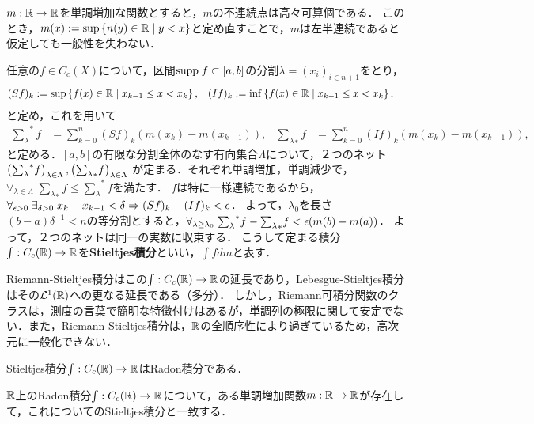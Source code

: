 \documentclass[uplatex,dvipdfmx]{jsreport}
\begin{document}
\begin{definition}
    $m:\mathbb{R}\to\mathbb{R}$を単調増加な関数とすると，$m$の不連続点は高々可算個である．
    このとき，$m(x):=\sup\left\{n(y)\in\mathbb{R}\mid y<x\right\}$と定め直すことで，$m$は左半連続であると仮定しても一般性を失わない．

    任意の$f\in C_c(X)$について，区間$\mathrm{supp}\; f\subset[a,b]$の分割$\lambda=(x_i)_{i\in n+1}$をとり，
    \begin{align*}
        (Sf)_k&:=\sup\left\{f(x)\in\mathbb{R}\mid x_{k-1}\le x<x_k\right\},&(If)_k&:=\inf\left\{f(x)\in\mathbb{R}\mid x_{k-1}\le x<x_k\right\},
    \end{align*}
    と定め，これを用いて
    \begin{align*}
        {\sum_{\lambda}}^*f&=\sum_{k=0}^n(Sf)_k(m(x_k)-m(x_{k-1})),&{\sum_{\lambda}}_*f&=\sum_{k=0}^n(If)_k(m(x_k)-m(x_{k-1})),
    \end{align*}
    と定める．$[a,b]$の有限な分割全体のなす有向集合$\Lambda$について，２つのネット$\left({\sum_\lambda}^* f\right)_{\lambda\in\Lambda},\left({\sum_\lambda}_*f\right)_{\lambda\in\Lambda}$
    が定まる．それぞれ単調増加，単調減少で，$\forall_{\lambda\in\Lambda}\;{\sum_\lambda}_*f\le{\sum_\lambda}^*f$を満たす．
    $f$は特に一様連続であるから，$\forall_{\epsilon>0}\;\exists_{\delta>0}\;x_k-x_{k-1}<\delta\Rightarrow(Sf)_k-(If)_k<\epsilon$．
    よって，$\lambda_0$を長さ$(b-a)\delta^{-1}<n$の等分割とすると，$\forall_{\lambda\ge\lambda_0}\;{\sum_\lambda}^*f-{\sum_\lambda}_*f<\epsilon(m(b)-m(a))$．
    よって，２つのネットは同一の実数に収束する．
    こうして定まる積分$\int:C_c(\mathbb{R})\to\mathbb{R}$を\textbf{Stieltjes積分}といい，$\int fdm$と表す．
\end{definition}
\begin{remarks}
    Riemann-Stieltjes積分はこの$\int:C_c(\mathbb{R})\to\mathbb{R}$の延長であり，Lebesgue-Stieltjes積分はその$\mathcal{L}^1(\mathbb{R})$への更なる延長である（多分）．
    しかし，Riemann可積分関数のクラスは，測度の言葉で簡明な特徴付けはあるが，単調列の極限に関して安定でない．また，Riemann-Stieltjes積分は，$\mathbb{R}$の全順序性により過ぎているため，高次元に一般化できない．
\end{remarks}

\begin{lemma}
    Stieltjes積分$\int:C_c(\mathbb{R})\to\mathbb{R}$はRadon積分である．
\end{lemma}

\begin{theorem}
    $\mathbb{R}$上のRadon積分$\int:C_c(\mathbb{R})\to\mathbb{R}$について，ある単調増加関数$m:\mathbb{R}\to\mathbb{R}$が存在して，これについてのStieltjes積分と一致する．
\end{theorem}
\end{document}
